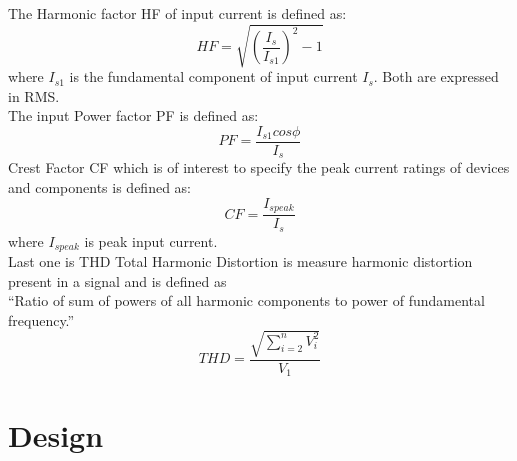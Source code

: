 The Harmonic factor HF of input current is defined as:
\begin{equation}
HF=\sqrt{(\frac{I_s}{I_{s1}})^2-1}
\end{equation}
where $I_{s1}$ is the fundamental component of input current $I_s$. Both are expressed in RMS.\\
The input Power factor PF is defined as:
\begin{equation}
PF=\frac{I_{s1}cos\phi}{I_s}
\end{equation}
Crest Factor CF which is of interest to specify the peak current ratings of devices and components is defined as:
 \begin{equation}
CF=\frac{I_{speak}}{I_s}
\end{equation}
where $I_{speak}$ is peak input current.\\
 Last one is THD Total Harmonic Distortion is measure harmonic distortion present in a signal and is defined as\\
 ``Ratio of sum of powers of all harmonic components to power of fundamental frequency.''
\begin{equation}
THD=\frac{\sqrt{\sum_{i=2}^{n}V_i^2}}{V_1}
\end{equation}
\section{Design}
